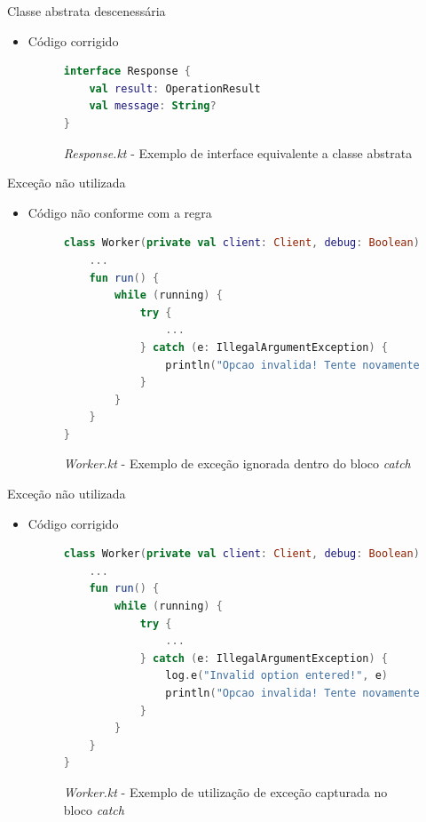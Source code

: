 \documentclass[brazilian]{beamer}
\begin{document}
\begin{frame}[fragile]{Classe abstrata descenessária}
    \begin{itemize}
        \item Código corrigido
        \begin{figure}[H]
            \centering
            \begin{lstlisting}[language=Kotlin]
interface Response {
    val result: OperationResult
    val message: String?
}
            \end{lstlisting}
            \caption{\textit{Response.kt} - Exemplo de interface equivalente a classe abstrata}
            \label{fig:detekt_unnecessary_abstract_class_after_example}
        \end{figure}
    \end{itemize}
\end{frame}

\begin{frame}[fragile]{Exceção não utilizada}
    \begin{itemize}
        \item Código não conforme com a regra
        \begin{figure}[H]
            \centering
            \begin{lstlisting}[language=Kotlin]
class Worker(private val client: Client, debug: Boolean) {
    ...
    fun run() {
        while (running) {
            try {
                ...
            } catch (e: IllegalArgumentException) {
                println("Opcao invalida! Tente novamente ou pressione Ctrl+D para finalizar.")
            }
        }
    }
}
            \end{lstlisting}
            \caption{\textit{Worker.kt} - Exemplo de exceção ignorada dentro do bloco \textit{catch}}
            \label{fig:detekt_swallowed_exception_before_example}
        \end{figure}
    \end{itemize}
\end{frame}

\begin{frame}[fragile]{Exceção não utilizada}
    \begin{itemize}
        \item Código corrigido
        \begin{figure}[H]
            \centering
            \begin{lstlisting}[language=Kotlin]
class Worker(private val client: Client, debug: Boolean) {
    ...
    fun run() {
        while (running) {
            try {
                ...
            } catch (e: IllegalArgumentException) {
                log.e("Invalid option entered!", e)
                println("Opcao invalida! Tente novamente ou pressione Ctrl+D para finalizar.")
            }
        }
    }
}
            \end{lstlisting}
            \caption{\textit{Worker.kt} - Exemplo de utilização de exceção capturada no bloco \textit{catch}}
            \label{fig:detekt_swallowed_exception_after_example}
        \end{figure}
    \end{itemize}
\end{frame}
\end{document}
